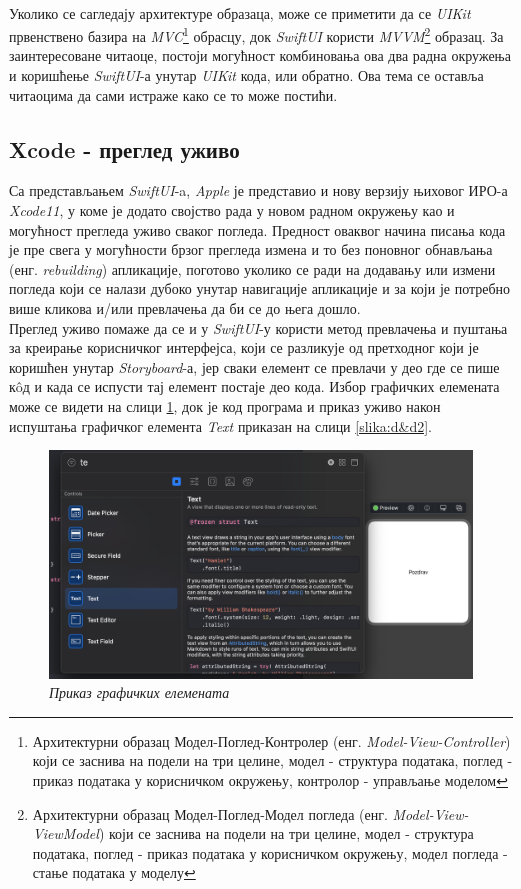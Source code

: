 \documentclass[12pt,oneside]{memoir}
\begin{document}
\\
\indent Уколико се сагледају архитектуре образаца, може се приметити да се \textit{UIKit} првенствено базира на \textit{MVC}\footnote{Архитектурни образац Модел-Поглед-Контролер (енг. \textit{Model-View-Controller}) који се заснива на подели на три целине, модел - структура података, поглед - приказ података у корисничком окружењу, контролор - управљање моделом} обрасцу, док \textit{SwiftUI} користи \textit{MVVM}\footnote{Архитектурни образац Модел-Поглед-Модел погледа (енг. \textit{Model-View-ViewModel}) који се заснива на подели на три целине, модел - структура података, поглед - приказ података у корисничком окружењу, модел погледа - стање података у моделу} образац. За заинтересоване читаоце, постоји могућност комбиновања ова два радна окружења и коришћење \textit{SwiftUI}-а унутар \textit{UIKit} кода, или обратно. Ова тема се оставља читаоцима да сами истраже како се то може постићи.

\subsection{Xcode - преглед уживо}
\label{subsec:Xcode - преглед уживо}

\indent Са представљањем \textit{SwiftUI}-a, \textit{Apple} је представио и нову верзију њиховог ИРО-а \textit{Xcode11}, у коме је додато својство рада у новом радном окружењу као и могућност прегледа уживо сваког погледа. Предност оваквог начина писања кода је пре свега у могућности брзог прегледа измена и то без поновног обнављања (енг. \textit{rebuilding}) апликације, поготово уколико се ради на додавању или измени погледа који се налази дубоко унутар навигације апликације и за који је потребно више кликова и/или превлачења да би се до њега дошло. 
\\
\indent Преглед уживо помаже да се и у \textit{SwiftUI}-у користи метод превлачења и пуштања за креирање корисничког интерфејса, који се разликује од претходног који је коришћен унутар \textit{Storyboard}-а, јер сваки елемент се превлачи у део где се пише к\^{o}д и када се испусти тај елемент постаје део кода. Избор графичких елемената може се видети на слици \ref{slika:d&d1}, док је код програма и приказ уживо након испуштања графичког елемента \textit{Text} приказан на слици \ref{slika:d&d2}.

\begin{figure}[H]
\includegraphics[width=1\textwidth]{images/Drag_and_drop_1.png}
\centering
\caption{\textit{Приказ графичких елемената}}
\label{slika:d&d1}
\end{figure}
\end{document}
